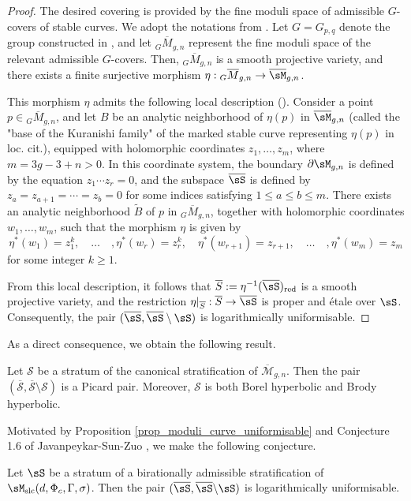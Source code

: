 \documentclass[11pt,letterpaper]{amsart}
\numberwithin{equation}{section}
\begin{document}
    \begin{proof}
    	The desired covering is provided by the fine moduli space of admissible $G$-covers of stable curves. We adopt the notations from \cite[Chapter VXI]{Griffiths2011}. Let $G = G_{p,q}$ denote the group constructed in \cite[Chapter VXI, \S 6]{Griffiths2011}, and let ${_{G}}\overline{M}_{g,n}$ represent the fine moduli space of the relevant admissible $G$-covers. Then, ${_{G}}\overline{M}_{g,n}$ is a smooth projective variety, and there exists a finite surjective morphism $\eta: {_{G}}\overline{M}_{g,n} \to \overline{\sM}_{g,n}$.
    	
    	This morphism $\eta$ admits the following local description (\cite[Remark (9.4)]{Griffiths2011}). Consider a point $p \in {_{G}}\overline{M}_{g,n}$, and let $B$ be an analytic neighborhood of $\eta(p)$ in $\overline{\sM}_{g,n}$ (called the "base of the Kuranishi family" of the marked stable curve representing $\eta(p)$ in loc. cit.), equipped with holomorphic coordinates $z_1, \dots, z_m$, where $m = 3g - 3 + n > 0$. In this coordinate system, the boundary $\partial\sM_{g,n}$ is defined by the equation $z_1 \cdots z_r = 0$, and the subspace $\overline{\sS}$ is defined by $z_a = z_{a+1} = \cdots = z_b = 0$ for some indices satisfying $1 \leq a \leq b \leq m$. There exists an analytic neighborhood $\widetilde{B}$ of $p$ in ${_{G}}\overline{M}_{g,n}$, together with holomorphic coordinates $w_1, \dots, w_m$, such that the morphism $\eta$ is given by
    	$$\eta^\ast(w_1)=z_1^k,\quad\dots\quad, \eta^\ast(w_r)=z_r^k,\quad \eta^\ast(w_{r+1})=z_{r+1}, \quad\dots\quad, \eta^\ast(w_{m})=z_{m}$$
    	for some integer $k \geq 1$.
    	
    	From this local description, it follows that $\overline{S} := \eta^{-1}(\overline{\sS})_{\rm red}$ is a smooth projective variety, and the restriction $\eta|_{\overline{S}}: \overline{S} \to \overline{\sS}$ is proper and \'etale over $\sS$. Consequently, the pair $(\overline{\sS}, \overline{\sS} \setminus \sS)$ is logarithmically uniformisable.
    \end{proof}
    As a direct consequence, we obtain the following result.    
    \begin{cor}
    	Let $\mathscr{S}$ be a stratum of the canonical stratification of $\overline{\mathscr{M}}_{g,n}$. Then the pair $(\overline{\mathscr{S}}, \overline{\mathscr{S}} \setminus \mathscr{S})$ is a Picard pair. Moreover, $\mathscr{S}$ is both Borel hyperbolic and Brody hyperbolic.
    \end{cor}
    Motivated by Proposition \ref{prop_moduli_curve_uniformisable} and Conjecture 1.6 of Javanpeykar-Sun-Zuo \cite{JSZ2024}, we make the following conjecture.
    \begin{conj}
    	Let $\sS$ be a stratum of a birationally admissible stratification of $\sM_{\rm slc}(d, \Phi_c, \Gamma, \sigma)$. Then the pair $(\overline{\sS},\overline{\sS}\backslash \sS)$ is logarithmically uniformisable.
    \end{conj}
\end{document}
